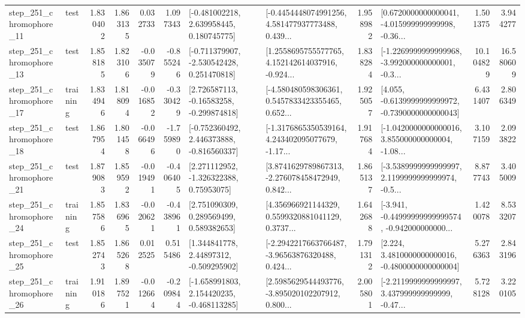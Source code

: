 \begin{tabular}{llrrrrllrlrr}
  step\_251\_chromophore\_11 &      test &      1.830402 &    1.863135 &      0.032733 &  1.097343 &    [-0.481002218, 2.639958445, 0.180745775] &  [-0.4454448074991256, 4.581477937773488, 0.439... &       1.958982 &  [0.6720000000000041, -4.015999999999998, -0.36... &            1.501375 &          3.944277 \\
  step\_251\_chromophore\_13 &      test &      1.858185 &    1.823106 &     -0.035079 & -0.855246 &   [-0.711379907, -2.530542428, 0.251470818] &  [1.2558695755577765, 4.152142614037916, -0.924... &       1.838284 &  [-1.2269999999999968, -3.992000000000001, -0.3... &           10.104829 &         16.580609 \\
  step\_251\_chromophore\_17 &  training &      1.834946 &    1.818094 &     -0.016852 & -0.330429 &    [2.726587113, -0.16583258, -0.299874818] &  [-4.580480598306361, 0.5457833423355465, 0.652... &       1.925057 &  [4.055, -0.6139999999999972, -0.7390000000000043] &            6.431407 &          2.806349 \\
  step\_251\_chromophore\_18 &      test &      1.867954 &    1.801458 &     -0.066496 & -1.759890 &   [-0.752360492, 2.446373888, -0.816560337] &  [-1.3176865350539164, 4.243402095077679, -1.17... &       1.917684 &  [-1.0420000000000016, 3.855000000000004, -1.08... &            3.107159 &          2.093822 \\
  step\_251\_chromophore\_21 &      test &      1.879083 &    1.859592 &     -0.019491 & -0.406405 &     [2.271112952, -1.326322388, 0.75953075] &  [3.8741629789867313, -2.276078458472949, 0.842... &       1.865137 &  [-3.5389999999999997, 2.1199999999999974, -0.5... &            8.877743 &          3.405009 \\
  step\_251\_chromophore\_24 &  training &      1.857586 &    1.836965 &     -0.020621 & -0.438961 &     [2.751090309, 0.289569499, 0.589382653] &  [4.356966921144329, 0.5599320881041129, 0.3737... &       1.642688 &  [-3.941, -0.44999999999999574, -0.942000000000... &            1.420078 &          8.533207 \\
  step\_251\_chromophore\_25 &      test &      1.852743 &    1.865268 &      0.012525 &  0.515486 &     [1.344841778, 2.44897312, -0.509295902] &  [-2.2942217663766487, -3.96563876320488, 0.424... &       1.791312 &   [2.224, 3.4810000000000016, -0.4800000000000004] &            5.276363 &          2.843196 \\
  step\_251\_chromophore\_26 &  training &      1.910186 &    1.897521 &     -0.012664 & -0.209844 &   [-1.658991803, 2.154420235, -0.468113285] &  [2.5985629544493776, -3.895020102207912, 0.800... &       2.005801 &  [-2.2119999999999997, 3.437999999999999, -0.47... &            5.728128 &          3.220105 \\

\end{tabular}
